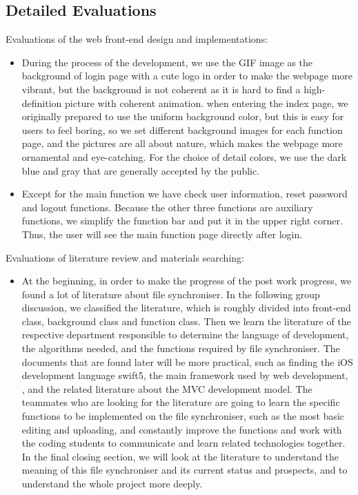 \subsection{Detailed Evaluations}

\noindent Evaluations of the web front-end design and implementations:
\begin{itemize}
 
    \item During the process of the development, we use the GIF image as the background of login page with a cute logo in order to make the webpage more vibrant, but the background is not coherent as it is hard to find a high-definition picture with coherent animation. when entering the index page, we originally prepared to use the uniform background color, but this is easy for users to feel boring, so we set different background images for each function page, and the pictures are all about nature, which makes the webpage more ornamental and eye-catching. For the choice of detail colors, we use the dark blue and gray that are generally accepted by the public.
    \item Except for the main function we have check user information, reset password and logout functions. Because the other three functions are auxiliary functions, we simplify the function bar and put it in the upper right corner. Thus, the user will see the main function page directly after login.
\end{itemize}


\noindent Evaluations of literature review and materials searching:
\begin{itemize}
    
    \item At the beginning, in order to make the progress of the post work progress, we found a lot of literature about file synchroniser. In the following group discussion, we classified the literature, which is roughly divided into front-end class, background class and function class. Then we learn the literature of the respective department responsible to determine the language of development, the algorithms needed, and the functions required by file synchroniser. The documents that are found later will be more practical, such as finding the iOS development language swift5, the main framework used by web development, , and the related literature about the MVC development model. The teammates who are looking for the literature are going to learn the specific functions to be implemented on the file synchroniser, such as the most basic editing and uploading, and constantly improve the functions and work with the coding students to communicate and learn related technologies together. In the final closing section, we will look at the literature to understand the meaning of this file synchroniser and its current status and prospects, and to understand the whole project more deeply.
\end{itemize}

